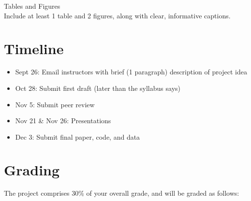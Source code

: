\documentclass[12pt]{article}
\begin{document}
Tables and Figures \\
Include at least 1 table and 2 figures, along with
clear, informative captions. 


\section*{Timeline}

\begin{itemize}
  \item Sept 26: Email instructors with brief (1 paragraph) description
    of project idea
  \item Oct 28: Submit first draft (later than the syllabus says)
  \item Nov 5: Submit peer review
  \item Nov 21 \& Nov 26: Presentations
  \item Dec 3: Submit final paper, code, and data
\end{itemize}


\section*{Grading}

The project comprises 30\% of your overall grade, and will be graded as follows:
\end{document}
